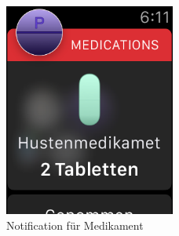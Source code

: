 \begin{figure}
	\caption{Notification für Medikament}
	\label{fig:watch-app-notification}
	\centering
	\includegraphics[width=0.5\textwidth]{04_realisation/screenshots/watch/notification.png}
\end{figure}

